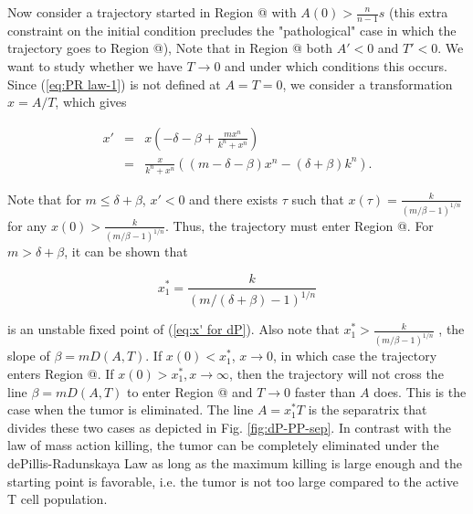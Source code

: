 \documentclass[review,authoryear]{elsarticle}
\makeatletter
\newcommand*{\rom}[1]{\expandafter\@slowromancap\romannumeral #1@}
\makeatother
\begin{document}
Now consider a trajectory started in Region \rom{1} with $A(0)>\frac{n}{n-1}s$ (this extra constraint on the initial condition precludes the "pathological" case in which the trajectory goes to Region \rom{4}),
Note that in Region \rom{1} both $A'<0$ and $T'<0$. We want to study whether we have $T\to0$ and under which conditions this occurs. Since (\ref{eq:PR law-1}) is not defined at $A=T=0$, we consider
a transformation $x=A/T$, which gives  
\begin{linenomath*}
\begin{eqnarray}
x' & = & x(-\delta-\beta+\frac{mx^{n}}{k^{n}+x^{n}})\label{eq:x' for dP}\\
 & = & \frac{x}{k^{n}+x^{n}}((m-\delta-\beta)x^{n}-(\delta+\beta)k^{n}).\nonumber 
\end{eqnarray}
\end{linenomath*}
Note that for $m\le\delta+\beta$, $x'<0$ and there exists $\tau$
such that $x(\tau)=\frac{k}{(m/\beta-1)^{1/n}}$ for any $x(0)>\frac{k}{(m/\beta-1)^{1/n}}$.
Thus, the trajectory must enter Region \rom{2}. For $m>\delta+\beta$, it can
be shown that 
\begin{linenomath*}
\[
x_{1}^{*}=\frac{k}{(m/(\delta+\beta)-1)^{1/n}}
\]
\end{linenomath*}
 is an unstable fixed point of (\ref{eq:x' for dP}). Also note that
$x_{1}^{*}>\frac{k}{(m/\beta-1)^{1/n}}$ , the slope of $\beta=mD(A,T)$.
If $x(0)<x_{1}^{*}$, $x\to0$, in which case the trajectory enters
Region \rom{2}. If $x(0)>x_{1}^{*},x\to\infty$, then the trajectory
will not cross the line $\beta=mD(A,T)$ to enter Region \rom{2} and $T\to0$
faster than $A$ does. This is the case when the tumor is eliminated.
The line $A=x_{1}^{*}T$ is the separatrix that divides these two cases
as depicted in Fig. \ref{fig:dP-PP-sep}. In contrast with the law
of mass action killing, the tumor can be completely eliminated under the
dePillis-Radunskaya Law as long as the maximum killing is large enough
and the starting point is favorable, i.e. the tumor is not too large
compared to the active T cell population. 
\end{document}
